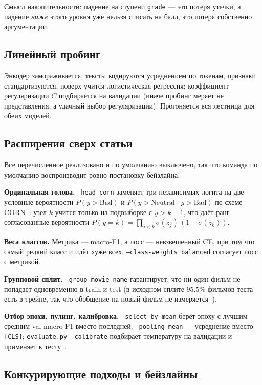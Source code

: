 \documentclass{article}
\begin{document}
Смысл накопительности: падение на ступени \texttt{grade} --- это потеря утечки, а падение
\emph{ниже} этого уровня уже нельзя списать на балл, это потеря собственно аргументации.

\subsection{Линейный пробинг}

Энкодер замораживается, тексты кодируются усреднением по токенам, признаки стандартизуются,
поверх учится логистическая регрессия; коэффициент регуляризации $C$ подбирается на валидации
(иначе пробинг меряет не представления, а удачный выбор регуляризации). Прогоняется вся
лестница для обеих моделей.

\subsection{Расширения сверх статьи}

Все перечисленное реализовано и по умолчанию выключено, так что команда по умолчанию
воспроизводит ровно постановку бейзлайна.

\textbf{Ординальная голова.} \texttt{--head corn} заменяет три независимых логита на две
условные вероятности $P(y > \text{Bad})$ и $P(y > \text{Neutral} \mid y > \text{Bad})$
по схеме CORN~\cite{shi2021deep}: узел $k$ учится только на подвыборке с $y > k-1$,
что даёт ранг-согласованные вероятности
$P(y = k) = \prod_{j<k}\sigma(z_j)\,(1 - \sigma(z_k))$.

\textbf{Веса классов.} Метрика --- macro-F1, а лосс --- невзвешенный CE, при том что самый
редкий класс и идёт хуже всех. \texttt{--class-weights balanced} согласует лосс с метрикой.

\textbf{Групповой сплит.} \texttt{--group movie\_name} гарантирует, что ни один фильм
не попадает одновременно в train и test (в исходном сплите 95.5\% фильмов теста есть
в трейне, так что обобщение на новый фильм не измеряется~\cite{gorman2019we}).

\textbf{Отбор эпохи, пулинг, калибровка.} \texttt{--select-by mean} берёт эпоху с лучшим
средним val macro-F1 вместо последней; \texttt{--pooling mean} --- усреднение вместо
\texttt{[CLS]}; \texttt{evaluate.py --calibrate} подбирает температуру на валидации
и применяет к тесту~\cite{guo2017calibration}.

\subsection{Конкурирующие подходы и бейзлайны}
\label{sec:baselines}
\end{document}
